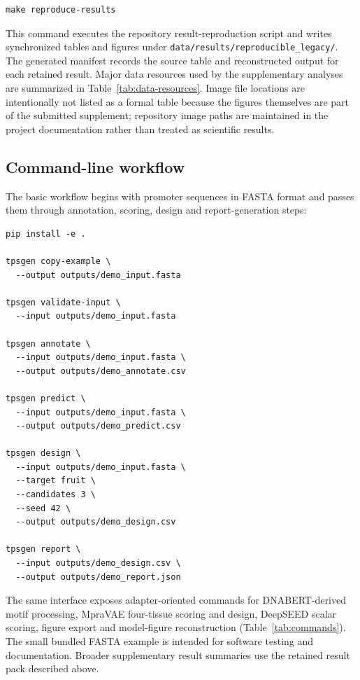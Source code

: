 \documentclass[10pt]{article}
\begin{document}
\begin{verbatim}
make reproduce-results
\end{verbatim}

This command executes the repository result-reproduction script and writes synchronized tables and figures under \texttt{data/results/reproducible\_legacy/}. The generated manifest records the source table and reconstructed output for each retained result. Major data resources used by the supplementary analyses are summarized in Table~\ref{tab:data-resources}. Image file locations are intentionally not listed as a formal table because the figures themselves are part of the submitted supplement; repository image paths are maintained in the project documentation rather than treated as scientific results.

\subsection{Command-line workflow}

The basic workflow begins with promoter sequences in FASTA format and passes them through annotation, scoring, design and report-generation steps:

\begin{verbatim}
pip install -e .

tpsgen copy-example \
  --output outputs/demo_input.fasta

tpsgen validate-input \
  --input outputs/demo_input.fasta

tpsgen annotate \
  --input outputs/demo_input.fasta \
  --output outputs/demo_annotate.csv

tpsgen predict \
  --input outputs/demo_input.fasta \
  --output outputs/demo_predict.csv

tpsgen design \
  --input outputs/demo_input.fasta \
  --target fruit \
  --candidates 3 \
  --seed 42 \
  --output outputs/demo_design.csv

tpsgen report \
  --input outputs/demo_design.csv \
  --output outputs/demo_report.json
\end{verbatim}

The same interface exposes adapter-oriented commands for DNABERT-derived motif processing, MpraVAE four-tissue scoring and design, DeepSEED scalar scoring, figure export and model-figure reconstruction (Table~\ref{tab:commands}). The small bundled FASTA example is intended for software testing and documentation. Broader supplementary result summaries use the retained result pack described above.
\end{document}
